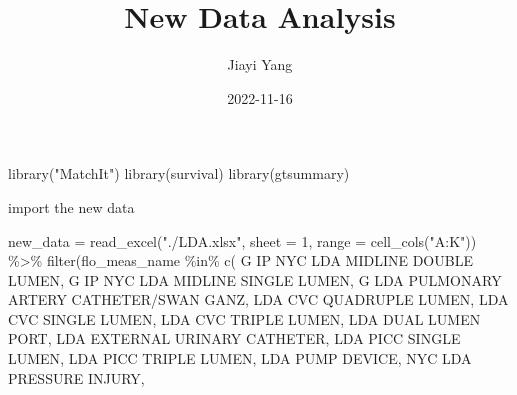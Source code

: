 \documentclass[
]{article}
\title{New Data Analysis}
\author{Jiayi Yang}
\date{2022-11-16}
\newenvironment{Shaded}{\begin{snugshade}}{\end{snugshade}}
\newcommand{\AttributeTok}[1]{\textcolor[rgb]{0.77,0.63,0.00}{#1}}
\newcommand{\DecValTok}[1]{\textcolor[rgb]{0.00,0.00,0.81}{#1}}
\newcommand{\FunctionTok}[1]{\textcolor[rgb]{0.00,0.00,0.00}{#1}}
\newcommand{\NormalTok}[1]{#1}
\newcommand{\OtherTok}[1]{\textcolor[rgb]{0.56,0.35,0.01}{#1}}
\newcommand{\SpecialCharTok}[1]{\textcolor[rgb]{0.00,0.00,0.00}{#1}}
\newcommand{\StringTok}[1]{\textcolor[rgb]{0.31,0.60,0.02}{#1}}
\begin{document}
\maketitle

\begin{Shaded}
\begin{Highlighting}[]
\FunctionTok{library}\NormalTok{(}\StringTok{"MatchIt"}\NormalTok{)}
\FunctionTok{library}\NormalTok{(survival)}
\FunctionTok{library}\NormalTok{(gtsummary)}
\end{Highlighting}
\end{Shaded}

import the new data

\begin{Shaded}
\begin{Highlighting}[]
\NormalTok{new\_data }\OtherTok{=} 
  \FunctionTok{read\_excel}\NormalTok{(}\StringTok{"./LDA.xlsx"}\NormalTok{, }\AttributeTok{sheet =} \DecValTok{1}\NormalTok{, }\AttributeTok{range =} \FunctionTok{cell\_cols}\NormalTok{(}\StringTok{"A:K"}\NormalTok{)) }\SpecialCharTok{\%\textgreater{}\%} 
  \FunctionTok{filter}\NormalTok{(flo\_meas\_name }\SpecialCharTok{\%in\%} \FunctionTok{c}\NormalTok{(  }\StringTok{\textquotesingle{}G IP NYC LDA MIDLINE DOUBLE LUMEN\textquotesingle{}}\NormalTok{,}
                                \StringTok{\textquotesingle{}G IP NYC LDA MIDLINE SINGLE LUMEN\textquotesingle{}}\NormalTok{,}
                                \StringTok{\textquotesingle{}G LDA PULMONARY ARTERY CATHETER/SWAN GANZ\textquotesingle{}}\NormalTok{,}
                                \StringTok{\textquotesingle{}LDA CVC QUADRUPLE LUMEN\textquotesingle{}}\NormalTok{,}
                                \StringTok{\textquotesingle{}LDA CVC SINGLE LUMEN\textquotesingle{}}\NormalTok{,}
                                \StringTok{\textquotesingle{}LDA CVC TRIPLE LUMEN\textquotesingle{}}\NormalTok{,}
                                \StringTok{\textquotesingle{}LDA DUAL LUMEN PORT\textquotesingle{}}\NormalTok{,}
                                \StringTok{\textquotesingle{}LDA EXTERNAL URINARY CATHETER\textquotesingle{}}\NormalTok{,}
                                \StringTok{\textquotesingle{}LDA PICC SINGLE LUMEN\textquotesingle{}}\NormalTok{,}
                                \StringTok{\textquotesingle{}LDA PICC TRIPLE LUMEN\textquotesingle{}}\NormalTok{,}
                                \StringTok{\textquotesingle{}LDA PUMP DEVICE\textquotesingle{}}\NormalTok{,}
                                \StringTok{\textquotesingle{}NYC LDA PRESSURE INJURY\textquotesingle{}}\NormalTok{,}

\end{Highlighting}
\end{Shaded}
\end{document}
